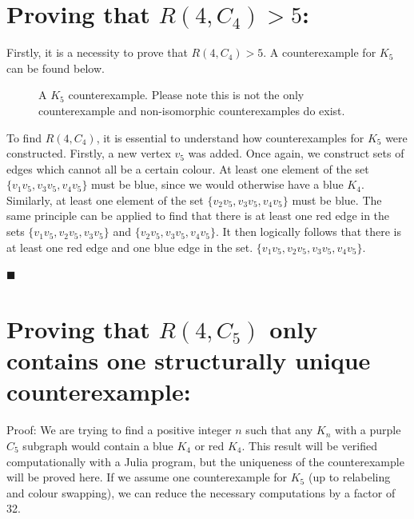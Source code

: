 \documentclass{article}
\begin{document}
\section{Proving that $R(4,C_4)>5$:}
Firstly, it is a necessity to prove that $R(4,C_4) > 5$. A counterexample for $K_5$ can be found below. 
\begin{figure}[h!]
\centering
{}
\caption{A $K_5$ counterexample. Please note this is not the only counterexample and non-isomorphic counterexamples do exist.}
\end{figure}
To find $R(4,C_4)$, it is essential to understand how counterexamples for $K_5$ were constructed. Firstly, a new vertex $v_5$ was added. Once again, we construct sets of edges which cannot all be a certain colour. At least one element of the set $\{v_1v_5,v_3v_5,v_4v_5\}$ must be blue, since we would otherwise have a blue $K_4$. Similarly, at least one element of the set $\{v_2v_5,v_3v_5,v_4v_5\}$ must be blue. The same principle can be applied to find that there is at least one red edge in the sets $\{v_1v_5,v_2v_5,v_3v_5\}$ and $\{v_2v_5,v_3v_5,v_4v_5\}$. It then logically follows that there is at least one red edge and one blue edge in the set. 
$\{v_1v_5,v_2v_5,v_3v_5,v_4v_5\}$.


\hfill$\blacksquare$
\section{Proving that $R(4,C_5)$ only contains one structurally unique counterexample:}
Proof: We are trying to find a positive integer $n$ such that any $K_n$ with a purple $C_5$ subgraph would contain a blue $K_4$ or red $K_4$. This result will be verified computationally with a Julia program, but the uniqueness of the counterexample will be proved here. If we assume one counterexample for $K_5$ (up to relabeling and colour swapping), we can reduce the necessary computations by a factor of 32.\\
\end{document}
